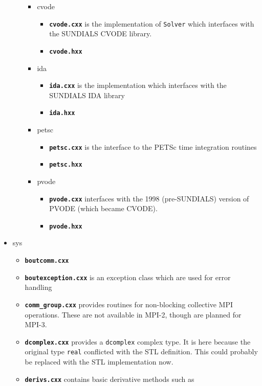 \documentclass[12pt]{article}
\newcommand{\code}[1]{\texttt{#1}}
\newcommand{\file}[1]{\texttt{\bf #1}}
\begin{document}
\begin{itemize}
\begin{itemize}
    \begin{itemize}
    \item cvode
      \begin{itemize}
      \item \file{cvode.cxx} is the implementation of \code{Solver} which
        interfaces with the SUNDIALS CVODE library.
      \item \file{cvode.hxx}
      \end{itemize}
    \item ida
      \begin{itemize}
      \item \file{ida.cxx} is the implementation which interfaces with the
        SUNDIALS IDA library
      \item \file{ida.hxx}
      \end{itemize}
    \item petsc
      \begin{itemize}
      \item \file{petsc.cxx} is the interface to the PETSc time integration
        routines
      \item \file{petsc.hxx}
      \end{itemize}
    \item pvode
      \begin{itemize}
      \item \file{pvode.cxx} interfaces with the 1998 (pre-SUNDIALS) version
        of PVODE (which became CVODE).
      \item \file{pvode.hxx}
      \end{itemize}
    \end{itemize}
  \end{itemize}
\item sys
  \begin{itemize}
  \item \file{boutcomm.cxx}
  \item \file{boutexception.cxx} is an exception class which are used
    for error handling
  \item \file{comm\_group.cxx} provides routines for non-blocking collective 
    MPI operations. These are not available in MPI-2, though are planned for
    MPI-3.
  \item \file{dcomplex.cxx} provides a \code{dcomplex} complex type. It is here
    because the original type \code{real} conflicted with the STL definition.
    This could probably be replaced with the STL implementation now.
  \item \file{derivs.cxx} contains basic derivative methods such as

\end{itemize}
\end{itemize}
\end{document}
